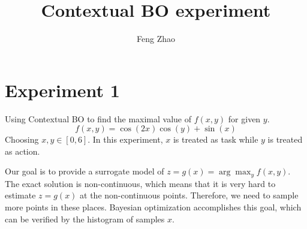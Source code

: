 \documentclass{article}
\title{Contextual BO experiment}
\author{Feng Zhao}
\begin{document}
\maketitle
\section{Experiment 1}
Using Contextual BO to find the maximal value of $f(x,y)$ for given $y$.
\begin{equation}\label{eq:f}
    f(x,y) = \cos(2 x) \cos(y) + \sin(x)
\end{equation}
Choosing $x,y \in [0,6]$.
In this experiment, $x$ is treated as task while $y$ is treated
as action.

Our goal is to provide a surrogate model of $z=g(x)=\arg\max_{y} f(x,y)$.
The exact solution is non-continuous, which means that it is very hard to estimate $z=g(x)$ at the
non-continuous points. Therefore, we need to sample more points in these places.
Bayesian optimization accomplishes this goal,
which can be verified by the histogram of samples $x$.
\end{document}
